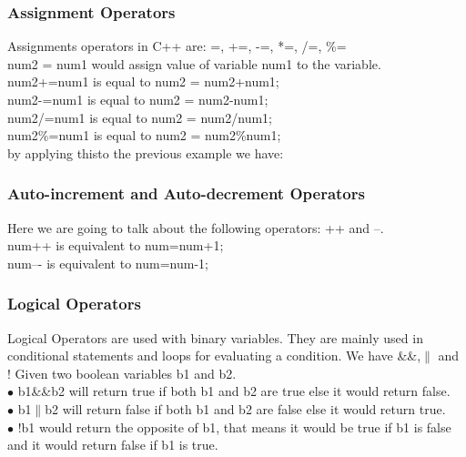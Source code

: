 \documentclass[11pt, a4paper]{article}
\begin{document}
\subsubsection{Assignment Operators}
Assignments operators in C++ are: =, +=, -=, *=, /=, \%= \\
num2 = num1 would assign value of variable num1 to the variable.\\
num2+=num1 is equal to num2 = num2+num1;\\
num2-=num1 is equal to num2 = num2-num1;\\
num2/=num1 is equal to num2 = num2/num1;\\
num2\%=num1 is equal to num2 = num2\%num1;\\
\newline by applying thisto the previous example we have:


\subsubsection{Auto-increment and Auto-decrement Operators}
Here we are going to talk about the following operators: ++ and --.\\
num++ is equivalent to num=num+1;\\
num–- is equivalent to num=num-1;


\subsubsection{Logical Operators}
Logical Operators are used with binary variables. They are mainly used in
conditional statements and loops for evaluating a condition. We have \&\&,$\|$ and !
Given two boolean variables b1 and b2.\\
$\bullet$ b1\&\&b2 will return true if both b1 and b2 are true else it would return false.\\
$\bullet$ b1$\|$b2 will return false if both b1 and b2 are false else it would return true.\\
$\bullet$ !b1 would return the opposite of b1, that means it would be true if b1 is false and
it would return false if b1 is true.

\end{document}
